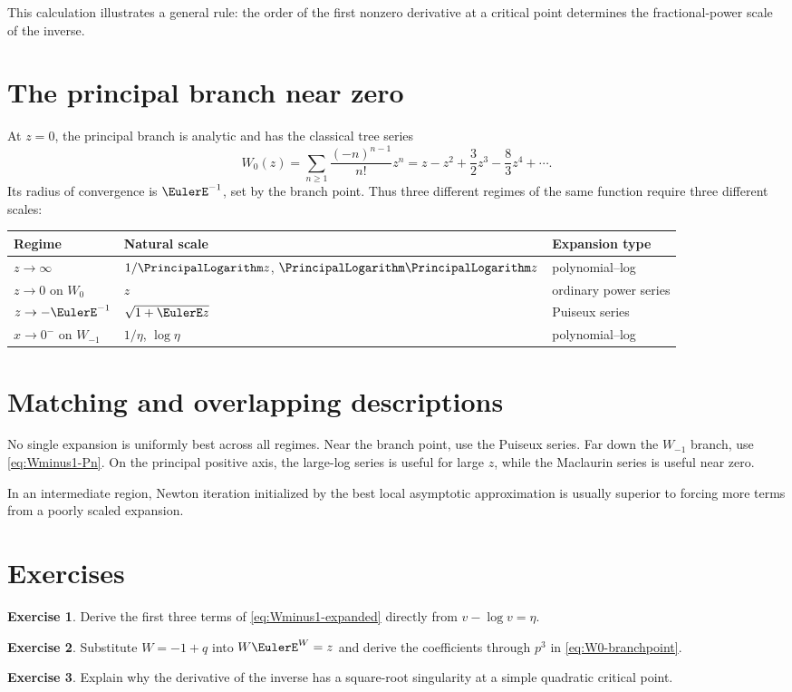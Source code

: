 \documentclass[11pt,openany]{book}
\theoremstyle{definition}
\newtheorem{exercise}{Exercise}[chapter]
\theoremstyle{plain}
\theoremstyle{remark}
\begin{document}
This calculation illustrates a general rule: the order of the first nonzero derivative at a critical point determines the fractional-power scale of the inverse.

\section{The principal branch near zero}
At \(z=0\), the principal branch is analytic and has the classical tree series
\begin{equation}\label{eq:W-Maclaurin}
 W_0(z)=\sum_{n\ge1}\frac{(-n)^{n-1}}{n!}z^n
 =z-z^2+\frac32z^3-\frac83z^4+\cdots.
\end{equation}
Its radius of convergence is \(\EulerE^{-1}\), set by the branch point. Thus three different regimes of the same function require three different scales:
\begin{center}
\begin{tabular}{@{}lll@{}}
\toprule
Regime & Natural scale & Expansion type\\
\midrule
\(z\to\infty\) & \(1/\PrincipalLogarithm z\), \(\PrincipalLogarithm\PrincipalLogarithm z\) & polynomial--log\\
\(z\to0\) on \(W_0\) & \(z\) & ordinary power series\\
\(z\to-\EulerE^{-1}\) & \(\sqrt{1+\EulerE z}\) & Puiseux series\\
\(x\to0^-\) on \(W_{-1}\) & \(1/\eta\), \(\log\eta\) & polynomial--log\\
\bottomrule
\end{tabular}
\end{center}

\section{Matching and overlapping descriptions}
No single expansion is uniformly best across all regimes. Near the branch point, use the Puiseux series. Far down the \(W_{-1}\) branch, use \cref{eq:Wminus1-Pn}. On the principal positive axis, the large-log series is useful for large \(z\), while the Maclaurin series is useful near zero.

In an intermediate region, Newton iteration initialized by the best local asymptotic approximation is usually superior to forcing more terms from a poorly scaled expansion.

\section{Exercises}
\begin{exercise}
Derive the first three terms of \cref{eq:Wminus1-expanded} directly from \(v-\log v=\eta\).
\end{exercise}
\begin{exercise}
Substitute \(W=-1+q\) into \(W\EulerE^W=z\) and derive the coefficients through \(p^3\) in \cref{eq:W0-branchpoint}.
\end{exercise}
\begin{exercise}
Explain why the derivative of the inverse has a square-root singularity at a simple quadratic critical point.
\end{exercise}
\end{document}

